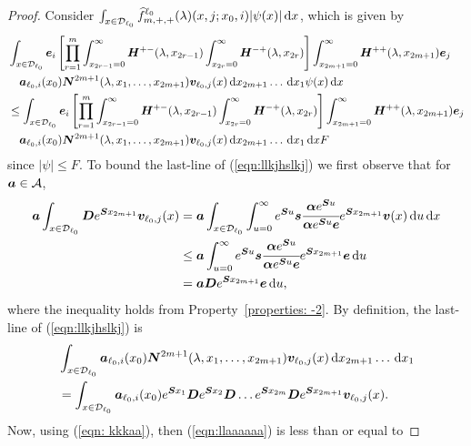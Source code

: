 \begin{proof}
	Consider \(\int_{x\in\mathcal{D}_{\ell_0}}\widehat f^{\ell_0}_{m,+,+}(\lambda)(x,j;x_0,i)|\psi(x)|\, \mathrm{d} x\), which is given by 
        \begin{align}
        	&\int_{x\in\mathcal{D}_{\ell_0}}\boldsymbol e_i \left[\prod_{r=1}^m\int_{x_{2r-1}=0}^\infty \boldsymbol H^{+-}(\lambda,x_{2r-1})\nonumber
			\int_{x_{2r}=0}^\infty \boldsymbol H^{-+}(\lambda,x_{2r}) \right]
			\int_{x_{2m+1}=0}^\infty \boldsymbol H^{++}(\lambda,x_{2m+1}) \boldsymbol e_j
			\\&\quad\boldsymbol a_{\ell_0,i}(x_0) \boldsymbol N^{2m+1}(\lambda,x_1,\dots,x_{2m+1}) {\boldsymbol v}_{\ell_0,j}( x)\, \mathrm{d} x_{2m+1}\dots\, \mathrm{d} x_1 \psi(x)\, \mathrm{d} x\nonumber
			\\&\leq \int_{x\in\mathcal{D}_{\ell_0}}\boldsymbol e_i \left[\prod_{r=1}^m\int_{x_{2r-1}=0}^\infty \boldsymbol H^{+-}(\lambda,x_{2r-1})\nonumber
			\int_{x_{2r}=0}^\infty \boldsymbol H^{-+}(\lambda,x_{2r}) \right]
			\int_{x_{2m+1}=0}^\infty \boldsymbol H^{++}(\lambda,x_{2m+1}) \boldsymbol e_j
			\\&\quad\boldsymbol a_{\ell_0,i}(x_0) \boldsymbol N^{2m+1}(\lambda,x_1,\dots,x_{2m+1}) {\boldsymbol v}_{\ell_0,j}( x)\, \mathrm{d} x_{2m+1}\dots\, \mathrm{d} x_1 \, \mathrm{d} x F 
			\label{eqn:llkjhslkj}
	\end{align}
	since \(|\psi|\leq F\). To bound the last-line of (\ref{eqn:llkjhslkj}) we first observe that for \(\boldsymbol a \in \mathcal A\), 
	\begin{align}
		\boldsymbol a\int_{x\in\mathcal{D}_{\ell_0}}\boldsymbol De^{\boldsymbol Sx_{2m+1}}{\boldsymbol v}_{\ell_0,j}(x) 
		&= \boldsymbol a\int_{x\in\mathcal{D}_{\ell_0}}\int_{u=0}^\infty e^{\boldsymbol Su}\boldsymbol s\cfrac{\boldsymbol \alpha e^{\boldsymbol S u}}{\boldsymbol \alpha e^{\boldsymbol S u}\boldsymbol e}e^{\boldsymbol Sx_{2m+1}}{\boldsymbol v}(x)\, \mathrm{d} u\, \mathrm{d} x\nonumber
		\\&\leq \boldsymbol a\int_{u=0}^\infty e^{\boldsymbol Su}\boldsymbol s\cfrac{\boldsymbol \alpha e^{\boldsymbol S u}}{\boldsymbol \alpha e^{\boldsymbol S u}\boldsymbol e}e^{\boldsymbol Sx_{2m+1}}{\boldsymbol e}\, \mathrm{d} u\nonumber
		\\&= \boldsymbol a\boldsymbol D e^{\boldsymbol Sx_{2m+1}}{\boldsymbol e}\, \mathrm{d} u, \label{eqn: kkkaa}
	\end{align}
	where the inequality holds from Property~\ref{properties: -2}. By definition, the last-line of (\ref{eqn:llkjhslkj}) is 
	\begin{align}
		&\int_{x\in\mathcal{D}_{\ell_0}} \boldsymbol a_{\ell_0,i}(x_0) \boldsymbol N^{2m+1}(\lambda,x_1,\dots,x_{2m+1}) {\boldsymbol v}_{\ell_0,j}( x)\, \mathrm{d} x_{2m+1}\dots\, \mathrm{d} x_1\nonumber
		\\&=\int_{x\in\mathcal{D}_{\ell_0}}\boldsymbol a_{\ell_0,i}(x_0)e^{\boldsymbol{S}x_1} \boldsymbol{D}e^{\boldsymbol{S}x_2} \boldsymbol{D}\dots e^{\boldsymbol{S}x_{2m}} \boldsymbol{D}e^{\boldsymbol{S}x_{2m+1}}{\boldsymbol v}_{\ell_0,j}(x).\label{eqn:llaaaaaa}
	\end{align}
	Now, using (\ref{eqn: kkkaa}), then (\ref{eqn:llaaaaaa}) is less than or equal to 

\end{proof}
